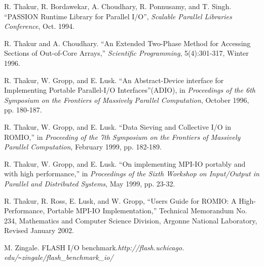 \documentclass[10pt,twocolumn]{article}          %
\begin{document}
\begin{thebibliography}{99}
R. Thakur, R. Bordawekar, A. Choudhary, R. Ponnusamy, and T.
Singh. ``PASSION Runtime Library for Parallel I/O'', {\em Scalable
Parallel Libraries Conference}, Oct. 1994.

R. Thakur and A. Choudhary. ``An Extended Two-Phase Method for
Accessing Sections of Out-of-Core Arrays,'' {\em Scientific
Programming}, 5(4):301-317, Winter 1996.

R. Thakur, W. Gropp, and E. Lusk. ``An Abstract-Device interface
for Implementing Portable Parallel-I/O Interfaces''(ADIO), in {\em
Proceedings of the 6th Symposium on the Frontiers of Massively
Parallel Computation}, October 1996, pp. 180-187.

R. Thakur, W. Gropp, and E. Lusk. ``Data Sieving and Collective
I/O in ROMIO,'' in {\em Proceeding of the 7th Symposium on the
Frontiers of Massively Parallel Computation}, February 1999, pp.
182-189.

R. Thakur, W. Gropp, and E. Lusk. ``On implementing MPI-IO portably and with high performance,'' in
{\em Proceedings of the Sixth Workshop on Input/Output in Parallel and Distributed Systems}, May
1999, pp. 23-32.

R. Thakur, R. Ross, E. Lusk, and W. Gropp, ``Users Guide for
ROMIO: A High-Performance, Portable MPI-IO Implementation,''
Technical Memorandum No. 234, Mathematics and Computer Science
Division, Argonne National Laboratory, Revised January 2002.

M. Zingale. FLASH I/O benchmark.{\em http://flash.uchicago.
edu/\verb|~|zingale/flash\_benchmark\_io/}

\end{thebibliography}
\end{document}
